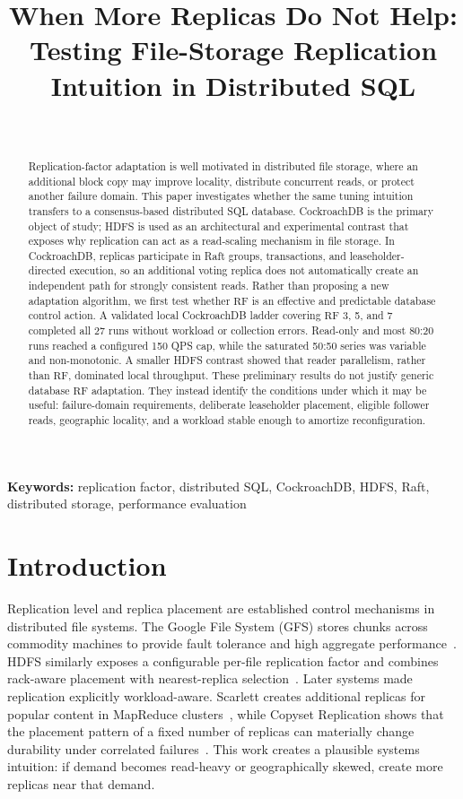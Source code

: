 \documentclass[a4paper,10pt,twocolumn]{article}
\title{\textbf{When More Replicas Do Not Help:}\\
Testing File-Storage Replication Intuition in Distributed SQL}
\author{\todoauthor\\\small \todoaffiliation}
\date{}
\newcommand{\rf}{\ensuremath{\mathrm{RF}}}
\newcommand{\cockroach}{CockroachDB}
\newcommand{\hdfs}{HDFS}
\newcommand{\qps}{QPS}
\begin{document}
\maketitle

\begin{abstract}
Replication-factor adaptation is well motivated in distributed file storage,
where an additional block copy may improve locality, distribute concurrent
reads, or protect another failure domain. This paper investigates whether the
same tuning intuition transfers to a consensus-based distributed SQL database.
\cockroach{} is the primary object of study; \hdfs{} is used as an
architectural and experimental contrast that exposes why replication can act
as a read-scaling mechanism in file storage. In \cockroach{}, replicas
participate in Raft groups, transactions, and leaseholder-directed execution,
so an additional voting replica does not automatically create an independent
path for strongly consistent reads. Rather than proposing a new adaptation
algorithm, we first test whether \rf{} is an effective and predictable
database control action. A validated local \cockroach{} ladder covering
\rf{} 3, 5, and 7 completed all 27 runs without workload or collection errors.
Read-only and most 80:20 runs reached a configured 150 \qps{} cap, while the
saturated 50:50 series was variable and non-monotonic. A smaller \hdfs{}
contrast showed that reader parallelism, rather than \rf{}, dominated local
throughput. These preliminary results do not justify generic database
\rf{} adaptation. They instead identify the conditions under which it may be
useful: failure-domain requirements, deliberate leaseholder placement,
eligible follower reads, geographic locality, and a workload stable enough to
amortize reconfiguration.
\end{abstract}

\noindent\textbf{Keywords:} replication factor, distributed SQL, CockroachDB,
HDFS, Raft, distributed storage, performance evaluation

\section{Introduction}
\label{sec:introduction}

Replication level and replica placement are established control mechanisms in
distributed file systems. The Google File System (GFS) stores chunks across
commodity machines to provide fault tolerance and high aggregate
performance~\citep{ghemawat2003gfs}. \hdfs{} similarly exposes a configurable
per-file replication factor and combines rack-aware placement with
nearest-replica selection~\citep{shvachko2010hdfs}. Later systems made
replication explicitly workload-aware. Scarlett creates additional replicas
for popular content in MapReduce clusters~\citep{ananthanarayanan2011scarlett},
while Copyset Replication shows that the placement pattern of a fixed number of
replicas can materially change durability under correlated
failures~\citep{cidon2013copysets}. This work creates a plausible systems
intuition: if demand becomes read-heavy or geographically skewed, create more
replicas near that demand.
\end{document}
